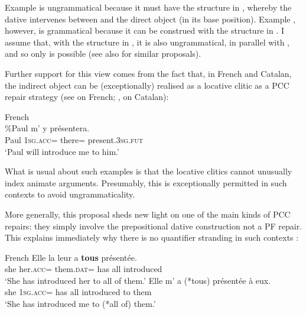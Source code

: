 \documentclass[output=paper,colorlinks,citecolor=brown,nonflat]{langsci/langscibook}
\begin{document}
Example  is ungrammatical because it must have the structure in , whereby the dative intervenes between \liv and the direct object (in its base position). Example , however, is grammatical because it can be construed with the structure in . I assume that, with the structure in , it is also ungrammatical, in parallel with , and so only  is possible (see also \citealt{Anagnostopoulou2003, Rezac2008} for similar proposals).

Further support for this view comes from the fact that, in French and Catalan, the indirect object can be (exceptionally) realised as a locative clitic as a PCC repair strategy (see \citealt{Postal1990, Rezac2008} on French; \citealt{Bonet1991}, \citeyear{Bonet2007} on Catalan):

\ea%
    \label{ex:sheehan:42}
    French\\
    \gll  \%Paul   m’       y       présentera.\\
            Paul   \textsc{1sg}.\textsc{acc}=   there\textsc{=}   present.\textsc{3sg.fut}\\
    \glt   ‘Paul will introduce me to him.’
\z

What is usual about such examples is that the locative clitics cannot unusually index animate arguments. Presumably, this is exceptionally permitted in such contexts to avoid ungrammaticality.

More generally, this proposal sheds new light on one of the main kinds of PCC repairs: they simply involve the prepositional dative construction not a PF repair. This explains immediately why there is no quantifier stranding in such contexts \citep{Kayne1975, Rezac2008}:

\ea%
    \label{ex:sheehan:43}
    French \citep[98]{Rezac2008}
    \ea\label{ex:sheehan:43a}
    \gll    Elle   la   leur   a   \textbf{tous}   présentée.\\
            she   her.\textsc{acc}=  them.\textsc{dat}=   has   all   introduced\\
    \glt   ‘She has introduced her to all of them.’
    \ex\label{ex:sheehan:43b}
    \gll    Elle m'   a   (*tous)   présentée     à   eux.\\
          she \textsc{1sg}.\textsc{acc}= has   all     introduced  to   them\\
    \glt     ‘She has introduced me to (*all of) them.’
    \z
\z
\end{document}
